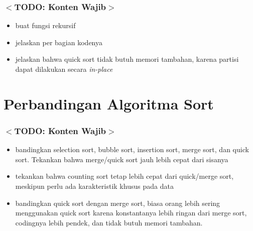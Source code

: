 \documentclass{beamer}
\begin{document}
\begin{frame}
\frametitle{$<$TODO: Konten Wajib$>$}
\begin{itemize}
	\item buat fungsi rekursif
	\item jelaskan per bagian kodenya
	\item jelaskan bahwa quick sort tidak butuh memori tambahan, karena partisi dapat dilakukan secara \textit{in-place}
\end{itemize}
\end{frame}

\section{Perbandingan Algoritma Sort}
\frame{\sectionpage}

\begin{frame}
\frametitle{$<$TODO: Konten Wajib$>$}
\begin{itemize}
	\item bandingkan selection sort, bubble sort, insertion sort, merge sort, dan quick sort. Tekankan bahwa merge/quick sort jauh lebih cepat dari sisanya
	\item tekankan bahwa counting sort tetap lebih cepat dari quick/merge sort, meskipun perlu ada karakteristik khusus pada data
	\item bandingkan quick sort dengan merge sort, biasa orang lebih sering menggunakan quick sort karena konstantanya lebih ringan dari merge sort, codingnya lebih pendek, dan tidak butuh memori tambahan.
\end{itemize}
\end{frame}
\end{document}
